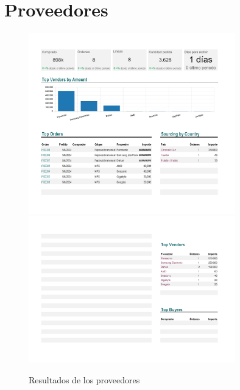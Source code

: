 \documentclass{report}
\begin{document}
        \section*{Proveedores}
            \begin{figure}[H]
                \centering
                \includegraphics[width=0.8\textwidth]{./img/Proveedores1.png}
                \includegraphics[width=0.8\textwidth]{./img/Proveedores2.png}
                \caption{Resultados de los proveedores}
            \end{figure}
\end{document}
